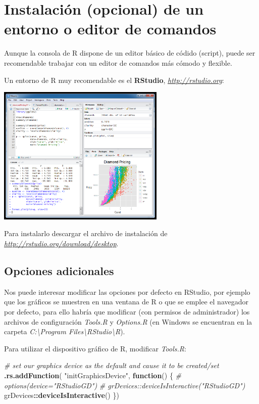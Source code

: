 \documentclass[
]{book}
\newenvironment{Shaded}{\begin{snugshade}}{\end{snugshade}}
\newcommand{\CommentTok}[1]{\textcolor[rgb]{0.56,0.35,0.01}{\textit{#1}}}
\newcommand{\ControlFlowTok}[1]{\textcolor[rgb]{0.13,0.29,0.53}{\textbf{#1}}}
\newcommand{\FunctionTok}[1]{\textcolor[rgb]{0.13,0.29,0.53}{\textbf{#1}}}
\newcommand{\NormalTok}[1]{#1}
\newcommand{\SpecialCharTok}[1]{\textcolor[rgb]{0.81,0.36,0.00}{\textbf{#1}}}
\newcommand{\StringTok}[1]{\textcolor[rgb]{0.31,0.60,0.02}{#1}}
\begin{document}
\hypertarget{instalaciuxf3n-opcional-de-un-entorno-o-editor-de-comandos}{%
\section{Instalación (opcional) de un entorno o editor de comandos}\label{instalaciuxf3n-opcional-de-un-entorno-o-editor-de-comandos}}

Aunque la consola de R dispone de un editor básico de códido (script),
puede ser recomendable trabajar con un editor de comandos más cómodo y
flexible.

Un entorno de R muy recomendable es el \textbf{RStudio},
\href{http://rstudio.org}{\emph{http://rstudio.org}}:

\includegraphics[width=0.6\textwidth,height=\textheight]{images/image8.png}

Para instalarlo descargar el archivo de instalación de
\href{http://rstudio.org/download/desktop}{\emph{http://rstudio.org/download/desktop}}.

\hypertarget{opciones-adicionales}{%
\subsection{Opciones adicionales}\label{opciones-adicionales}}

Nos puede interesar modificar las opciones por defecto en RStudio, por ejemplo que los gráficos se muestren en una ventana de R o que se emplee el navegador por defecto, para ello habría que modificar (con permisos de administrador) los archivos de configuración \emph{Tools.R} y \emph{Options.R}
(en Windows se encuentran en la carpeta \emph{C:\textbackslash Program Files\textbackslash RStudio\textbackslash R}).

Para utilizar el dispositivo gráfico de R, modificar \emph{Tools.R}:

\begin{Shaded}
\begin{Highlighting}[]
\CommentTok{\# set our graphics device as the default and cause it to be created/set}
\FunctionTok{.rs.addFunction}\NormalTok{( }\StringTok{"initGraphicsDevice"}\NormalTok{, }\ControlFlowTok{function}\NormalTok{()}
\NormalTok{\{}
   \CommentTok{\# options(device="RStudioGD")}
   \CommentTok{\# grDevices::deviceIsInteractive("RStudioGD")}
\NormalTok{  grDevices}\SpecialCharTok{::}\FunctionTok{deviceIsInteractive}\NormalTok{()}
\NormalTok{\})}
\end{Highlighting}
\end{Shaded}
\end{document}
